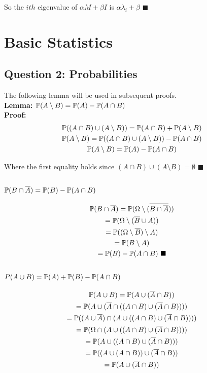 \documentclass[11pt, oneside]{article}   	%
\begin{document}
So the $ith$ eigenvalue of $\alpha M + \beta I$ is $\alpha \lambda_i + \beta$ $\blacksquare$

\section{Basic Statistics}
\subsection{Question 2: Probabilities}
The following lemma will be used in subsequent proofs.\\
\textbf{Lemma: $\Bbb P(A \setminus B) = \Bbb P(A) - \Bbb P(A \cap B)$}\\
\textbf{Proof:}
\begin{gather*}
\Bbb P((A \cap B) \cup (A \setminus B)) = \Bbb P(A \cap B) + \Bbb P(A \setminus B) \\
\Bbb P(A \setminus B) = \Bbb P((A \cap B) \cup (A \setminus B)) - \Bbb P(A \cap B) \\
\Bbb P(A \setminus B) = \Bbb P(A) - \Bbb P(A \cap B)
\end{gather*}

Where the first equality holds since $(A \cap B) \cup (A \setminus B) = \emptyset$ $\blacksquare$

\subsubsection{$\Bbb P(B \cap \overline{A}) = \Bbb P(B) - \Bbb P(A \cap B)$}
\begin{gather*}
 \Bbb P(B \cap \overline{A}) =  \Bbb P(\Omega \setminus (\overline{B \cap \overline{A}})) \\
=  \Bbb P(\Omega \setminus (\overline{B} \cup A)) \\
= \Bbb P((\Omega \setminus \overline{B}) \setminus A) \\
= \Bbb P(B \setminus A) \\
= \Bbb P(B) - \Bbb P(A \cap B) \text{ } \blacksquare
\end{gather*}

\subsubsection{$P(A \cup B) = \Bbb P(A) + \Bbb P(B) - \Bbb P(A \cap B)$}
\begin{gather*}
\Bbb P(A \cup B) = \Bbb P(A \cup (\overline{A} \cap B)) \\
= \Bbb P(A \cup (\overline{A} \cap ((A \cap B) \cup (\overline{A} \cap B)))) \\
= \Bbb P((A \cup \overline{A}) \cap (A \cup ((A \cap B) \cup (\overline{A} \cap B)))) \\
= \Bbb P(\Omega \cap (A \cup ((A \cap B) \cup (\overline{A} \cap B)))) \\
= \Bbb P(A \cup ((A \cap B) \cup (\overline{A} \cap B))) \\
= \Bbb P((A \cup (A \cap B)) \cup (\overline{A} \cap B)) \\
= \Bbb P(A \cup (\overline{A} \cap B))
\end{gather*}
\end{document}
